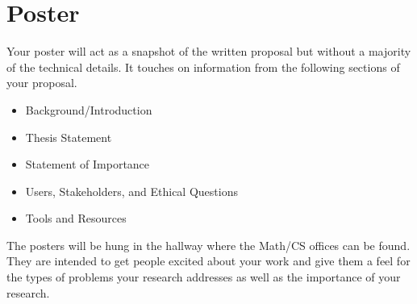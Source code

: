 \documentclass[10pt]{article}
\begin{document}
\section{Poster}

Your poster will act as a snapshot of the written proposal but without a majority of the technical details.  It touches on information from the following sections of your proposal.
\begin{itemize}
\item Background/Introduction
\item Thesis Statement
\item Statement of Importance
\item Users, Stakeholders, and Ethical Questions
\item Tools and Resources
\end{itemize}
The posters will be hung in the hallway where the Math/CS offices can be found.  They are intended to get people excited about your work and give them a feel for the types of problems your research addresses as well as the importance of your research. 
\end{document}

